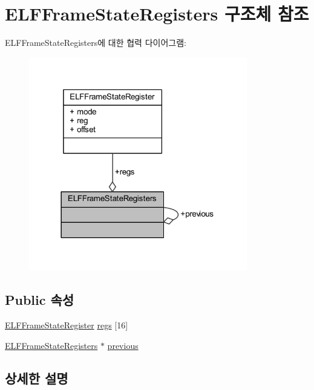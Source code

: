 \hypertarget{struct_e_l_f_frame_state_registers}{}\section{E\+L\+F\+Frame\+State\+Registers 구조체 참조}
\label{struct_e_l_f_frame_state_registers}


E\+L\+F\+Frame\+State\+Registers에 대한 협력 다이어그램\+:\nopagebreak
\begin{figure}[H]
\begin{center}
\leavevmode
\includegraphics[width=270pt]{struct_e_l_f_frame_state_registers__coll__graph}
\end{center}
\end{figure}
\subsection*{Public 속성}
\begin{DoxyCompactItemize}
\item 
\mbox{\hyperlink{struct_e_l_f_frame_state_register}{E\+L\+F\+Frame\+State\+Register}} \mbox{\hyperlink{struct_e_l_f_frame_state_registers_a0b3a4a2b86db2d98e9f0e05837bc7038}{regs}} \mbox{[}16\mbox{]}
\item 
\mbox{\hyperlink{struct_e_l_f_frame_state_registers}{E\+L\+F\+Frame\+State\+Registers}} $\ast$ \mbox{\hyperlink{struct_e_l_f_frame_state_registers_ac15ca53b64834c92c4c43b2652a082ed}{previous}}
\end{DoxyCompactItemize}


\subsection{상세한 설명}


